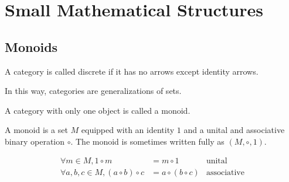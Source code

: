 \section{Small Mathematical Structures}
\subsection{Monoids}
\begin{definition}
	A category is called discrete if it has no arrows except identity arrows.
\end{definition}
In this way, categories are generalizations of sets.
\begin{definition}
	A category with only one object is called a monoid.
\end{definition}
\begin{definition}
	A monoid is a set $M$ equipped with an identity $1$ and a unital and associative
	binary operation $\circ$. The monoid is sometimes written fully as $(M, \circ,
		1)$.
\end{definition}
\begin{align*}
	\forall m \in       M, 1\circ m          & = m \circ 1        & \text{unital} \\
	\forall a, b, c \in M, (a\circ b)\circ c & = a \circ (b \circ
	c)                                       & \text{associative}
\end{align*}
